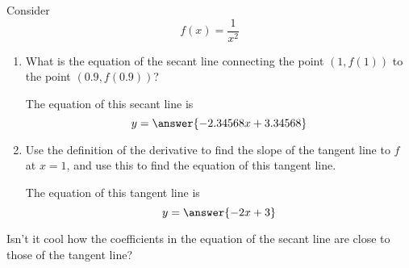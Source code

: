 \documentclass{ximera}
\author{Steven Gubkin}
\begin{document}
\begin{exercise}

Consider 
\[
f(x) = \frac{1}{x^2}
\]



\begin{enumerate}
\item What is the equation of the secant line connecting the point $(1,f(1))$ to the point $(0.9,f(0.9))$? 
\begin{prompt} 
The equation of this secant line is
$$ y = \answer{ -2.34568x+ 3.34568}$$ 
\end{prompt}

\item  Use the definition of the derivative to find the slope of the tangent line to $f$ at $x=1$, and use this to find the equation of this tangent line.

\begin{prompt} 
The equation of this tangent line is
$$ y = \answer{ -2x + 3}$$ 
\end{prompt}

\end{enumerate}

Isn't it cool how the coefficients in the equation of the secant line are close to those of the tangent line?
\end{exercise}
\end{document}
